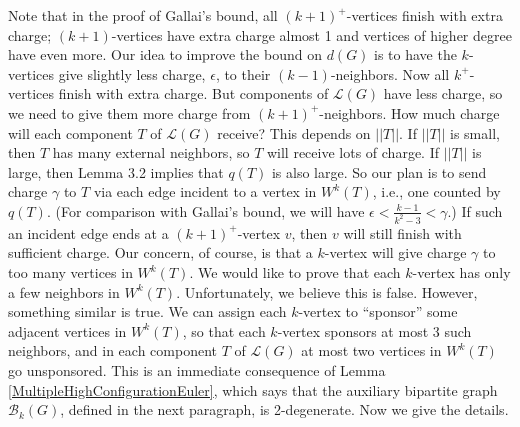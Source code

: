\documentclass[12pt]{article}
\theoremstyle{plain}
\theoremstyle{definition}
\theoremstyle{remark}
\newcommand{\fancy}[1]{\mathcal{#1}}
\newcommand{\B}{\fancy{B}}
\renewcommand{\L}{\fancy{L}}
\begin{document}
Note that in the proof of Gallai's bound, all $(k+1)^+$-vertices finish with
extra charge; $(k+1)$-vertices have extra charge almost 1 and vertices of
higher degree have even more.  Our idea to improve the bound on $d(G)$ is to
have the $k$-vertices give slightly less charge, $\epsilon$, to their
$(k-1)$-neighbors.  Now all $k^+$-vertices finish with extra charge.  But
components of $\L(G)$ have less charge, so we need to give them more charge
from $(k+1)^+$-neighbors.  How much charge will each component $T$ of $\L(G)$
receive? This depends on $||T||$.  If $||T||$ is small, then $T$ has many
external neighbors, so $T$ will receive lots of charge.  If $||T||$ is large,
then Lemma 3.2 implies that $q(T)$ is also large.  So our plan is to send
charge $\gamma$ to $T$ via each edge incident to a vertex in $W^k(T)$, i.e.,
one counted by $q(T)$.  (For comparison with Gallai's bound, we will have
$\epsilon < \frac{k-1}{k^2-3} < \gamma$.)  If such an incident edge ends at a
$(k+1)^+$-vertex $v$, then $v$ will still finish with sufficient charge.  Our
concern, of course, is that a $k$-vertex will give charge $\gamma$ to too many
vertices in $W^k(T)$.  We would like to prove that each $k$-vertex has only a
few neighbors in $W^k(T)$.  Unfortunately, we believe this is false. However,
something similar is true.  We can assign each $k$-vertex to ``sponsor'' some
adjacent vertices in $W^k(T)$, so that each
$k$-vertex sponsors at most 3 such neighbors, and in each component $T$ of
$\L(G)$ at most two vertices in $W^k(T)$ go unsponsored.  This is an
immediate consequence of Lemma \ref{MultipleHighConfigurationEuler}, which says
that the auxiliary bipartite graph $\B_k(G)$, defined in 
the next paragraph, is 2-degenerate.  Now we give the details.
\end{document}
